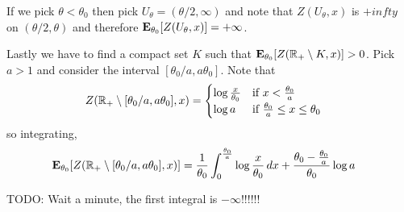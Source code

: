 \begin{examp}
If we pick $\theta < \theta_0$ then pick $U_\theta = (\theta/2,
\infty)$ and note that $Z(U_\theta, x)$ is $+infty$ on $(\theta/2,
\theta)$ and therefore $\sexpectation{Z(U_\theta, x)}{\theta_0} =
+\infty$.

Lastly we have to find a compact set $K$ such that
$\sexpectation{Z(\reals_+ \setminus K, x)}{\theta_0} > 0$.  Pick $a >
1$ and consider the interval $[\theta_0/a, a\theta_0]$.  Note that 
\begin{align*}
Z(\reals_+ \setminus [\theta_0/a, a\theta_0], x) &= \begin{cases}
\log \frac{x}{\theta_0} & \text{if $x < \frac{\theta_0}{a}$} \\
\log a & \text{if $\frac{\theta_0}{a} \leq x \leq \theta_0$} \\
\end{cases}
\end{align*}
so integrating,
\begin{align*}
\sexpectation{Z(\reals_+ \setminus [\theta_0/a, a\theta_0],
  x)}{\theta_0} &= 
\frac{1}{\theta_0} \int_0^{\frac{\theta_0}{a}} \log \frac{x}{\theta_0}
\, dx
+ \frac{\theta_0 - \frac{\theta_0}{a}}{\theta_0} \log a
\end{align*}

TODO:  Wait a minute, the first integral is $-\infty$!!!!!!
\end{examp}

